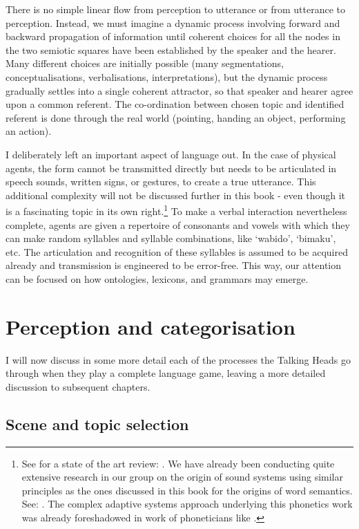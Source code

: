 There is no simple linear flow from perception to utterance 
or from utterance to perception. Instead, we must imagine a dynamic process 
involving forward and backward propagation of information 
until coherent choices for all the nodes in the two
semiotic squares have been established by the speaker and 
the hearer. Many different choices are initially possible 
(many segmentations, conceptualisations, verbalisations, 
interpretations), but the dynamic process gradually settles into 
a single coherent attractor, so that speaker and hearer 
agree upon a common referent. The co-ordination between 
chosen topic and identified referent is done through 
the real world (pointing, handing an object, performing
an action). 

I deliberately left an important aspect of language out. 
In the case of physical agents, the form cannot be transmitted
directly but needs to be articulated in speech sounds, 
written signs, or gestures, to create a true utterance. This additional 
complexity will not be discussed further in this book - even though 
it is a fascinating topic in its own right.\footnote{
See for a state of the art review: \cite{Clark:1990}. 
We have already been conducting quite extensive 
research in our group on the origin of sound systems 
using similar principles as the ones discussed in this 
book for the origins of word semantics. 
See: \cite{DeBoer:1997}. The complex 
adaptive systems approach underlying this phonetics
work was already foreshadowed in work of phoneticians
like \cite{Liljencrants:1972}.}
To make a verbal interaction nevertheless complete, agents
are given a repertoire of consonants and vowels with 
which they can make random syllables and syllable combinations, 
like `wabido', `bimaku', etc. The articulation and 
recognition of these syllables is assumed to be acquired
already and transmission is engineered to be error-free. 
This way, our attention can be focused on how
ontologies, lexicons, and grammars may emerge. 

\section{Perception and categorisation}

I will now discuss in some more detail each of the processes
the Talking Heads go through when they 
play a complete language game, leaving a more detailed 
discussion to subsequent chapters.

\subsection{Scene and topic selection}

